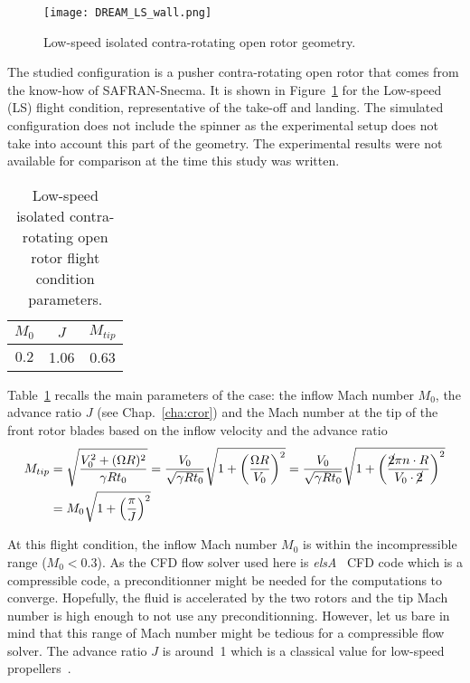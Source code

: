 

\begin{figure}[htp]
  \centering
  \texttt{[image: DREAM\_LS\_wall.png]}
  \caption{Low-speed isolated contra-rotating open rotor geometry.}
  \label{fig:dream_ls_wall}
\end{figure}

The studied configuration is a pusher contra-rotating open rotor
that comes from the know-how of SAFRAN-Snecma. 
It is shown in Figure~\ref{fig:dream_ls_wall} for the
Low-speed (LS) flight condition, representative of the take-off
and landing.
The simulated configuration does not include the spinner as the
experimental setup does not take into account this part of the geometry.
The experimental results were not available for comparison
at the time this study was written.

\begin{table}[htp]
   \centering
  \begin{tabular}{ccc}
    \toprule
    $M_0$ & $J$ & $M_{tip}$ \\
    \midrule
    $0.2$ & 1.06 & 0.63 \\
    \bottomrule
  \end{tabular}
  \caption{Low-speed isolated contra-rotating open rotor flight condition parameters.}
  \label{tab:dream_ls_flight_condition}
\end{table} 
Table~\ref{tab:dream_ls_flight_condition} recalls the main
parameters of the case: the inflow Mach number $M_0$,
the advance ratio $J$ (see Chap.~\ref{cha:cror})
and the Mach number at the tip of
the front rotor blades based on the inflow 
velocity and the advance ratio
\begin{equation}
  \begin{split}
    M_{tip} &= 
        \sqrt{\frac{V_0^2 + (\Omega R)^2}{\gamma R t_0}} =
        \frac{V_0}{\sqrt{\gamma R t_0}} 
          \sqrt{1 + \left(\frac{\Omega R}{V_0}\right)^2} =
        \frac{V_0}{\sqrt{\gamma R t_0}} 
          \sqrt{1 + \left(\frac{\cancel{2} \pi n \cdot R}{
          V_0 \cdot \cancel{2}}\right)^2} \\
    &= M_0 \sqrt{1 + \left(\frac{\pi}{J} \right)^2}
  \end{split}
  \label{eq:m_tip}
\end{equation}

At this flight condition, the inflow Mach 
number $M_0$ is within the incompressible range
($M_0 < 0.3$). As the CFD flow solver used here is 
\textit{elsA}~\cite{Cambier2013} CFD code which is a compressible code, 
a preconditionner might be needed for the computations to converge. 
Hopefully, the fluid is accelerated by the two rotors
and the tip Mach number is high enough to not use any preconditionning.
However, let us bare in mind that this range of Mach number might
be tedious for a compressible flow solver.
The advance ratio $J$ is around~1 which is a classical value for
low-speed propellers~\cite{Bousquet2012}. 

